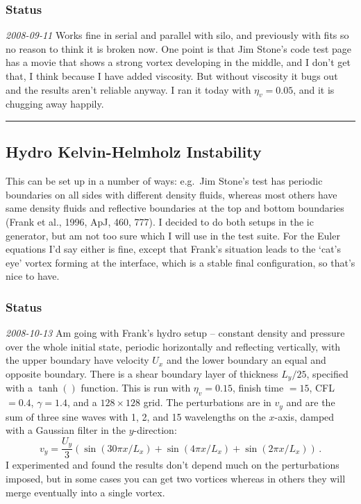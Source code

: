 \documentclass[11pt]{article}
\begin{document}
\subsubsection{Status}
\textit{2008-09-11} Works fine in serial and parallel with silo, and
previously with fits so no reason to think it is broken now.  One
point is that Jim Stone's code test page has a movie that shows a
strong vortex developing in the middle, and I don't get that, I think
because I have added viscosity.  But without viscosity it bugs out and
the results aren't reliable anyway.  I ran it today with
$\eta_v=0.05$, and it is chugging away happily.

\vspace{0.4cm} \hrule
\subsection{Hydro Kelvin-Helmholz Instability}
This can be set up in a number of ways: e.g.\ Jim Stone's test has
periodic boundaries on all sides with different density fluids,
whereas most others have same density fluids and reflective boundaries
at the top and bottom boundaries (Frank et al., 1996, ApJ, 460, 777).
I decided to do both setups in the ic generator, but am not too sure
which I will use in the test suite.  For the Euler equations I'd say
either is fine, except that Frank's situation leads to the `cat's eye'
vortex forming at the interface, which is a stable final
configuration, so that's nice to have.
\subsubsection{Status}
\textit{2008-10-13} Am going with Frank's hydro setup -- constant
density and pressure over the whole initial state, periodic
horizontally and reflecting vertically, with the upper boundary have
velocity $U_x$ and the lower boundary an equal and opposite boundary.
There is a shear boundary layer of thickness $L_y/25$, specified with
a $\tanh()$ function.  This is run with $\eta_v=0.15$, finish time
$=15$, CFL$=0.4$, $\gamma=1.4$, and a $128\times128$ grid.  The
perturbations are in $v_y$ and are the sum of three sine waves with 1,
2, and 15 wavelengths on the $x$-axis, damped with a Gaussian filter
in the $y$-direction:
\[ v_y = \frac{U_y}{3}\left( \sin(30\pi x/L_x) + \sin(4\pi x/L_x) +
  \sin(2\pi x/L_x) \right)\,. \]
I experimented and found the results don't depend much on the
perturbations imposed, but in some cases you can get two vortices
whereas in others they will merge eventually into a single vortex.
\end{document}

